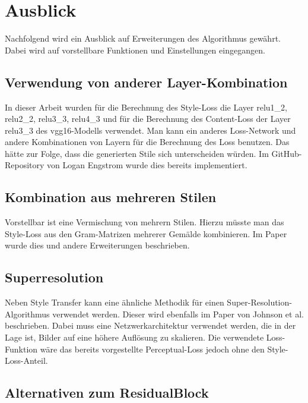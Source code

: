 \section{Ausblick}

Nachfolgend wird ein Ausblick auf Erweiterungen des Algorithmus gewährt. Dabei wird auf vorstellbare Funktionen und Einstellungen eingegangen.

\subsection{Verwendung von anderer Layer-Kombination}

In dieser Arbeit wurden für die Berechnung des Style-Loss die Layer relu1\_2, relu2\_2, relu3\_3, relu4\_3 und für die Berechnung des Content-Loss der Layer relu3\_3 des \gls{vgg16}-Modells verwendet. Man kann ein anderes Loss-Network und andere Kombinationen von Layern für die Berechnung des Loss benutzen. Das hätte zur Folge, dass die generierten Stile sich unterscheiden würden. Im GitHub-Repository von Logan Engstrom  \cite{engstrom2016faststyletransfer} wurde dies bereits implementiert.

\subsection{Kombination aus mehreren Stilen}
\label{sec:combination_many_styles}

Vorstellbar ist eine Vermischung von mehrern Stilen. Hierzu müsste man das Style-Loss aus den Gram-Matrizen mehrerer Gemälde kombinieren. Im Paper \cite{stanfordStyleTransfer} wurde dies und andere Erweiterungen beschrieben.

\subsection{Superresolution}
\label{sec:superresolution}

Neben Style Transfer kann eine ähnliche Methodik für einen Super-Resolution-Algorithmus verwendet werden. Dieser wird ebenfalls im Paper von Johnson et al. \cite{DBLP:journals/corr/JohnsonAL16} beschrieben. Dabei muss eine Netzwerkarchitektur verwendet werden, die in der Lage ist, Bilder auf eine höhere Auflösung zu skalieren. Die verwendete Loss-Funktion wäre das bereits vorgestellte Perceptual-Loss jedoch ohne den Style-Loss-Anteil.

\subsection{Alternativen zum ResidualBlock}
\label{sec:alternatives_to_residual_block}

